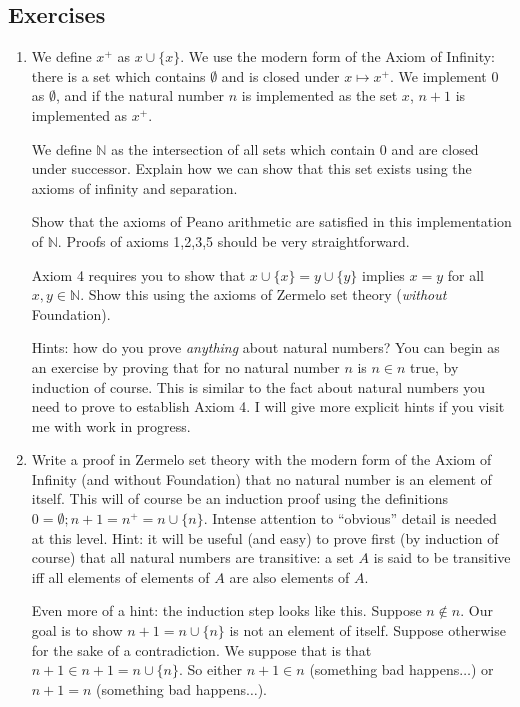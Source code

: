 \documentclass[12pt]{book}
\begin{document}
\newpage

\subsection{Exercises}

\begin{enumerate}

\item  We define $x^+$ as $x \cup \{x\}$.  We use the modern form of the
Axiom of Infinity:  there is a set which contains $\emptyset$ and is closed
under $x \mapsto x^+$.  We implement 0 as $\emptyset$, and if the natural
number $n$ is implemented as the set $x$, $n+1$ is implemented as $x^+$.

We define $\mathbb N$ as the intersection of all sets which contain 0
and are closed under successor.  Explain how we can show that this set
exists using the axioms of infinity and separation.

Show that the axioms of Peano arithmetic are satisfied in this implementation
of $\mathbb N$.  Proofs of axioms 1,2,3,5 should be very straightforward.

Axiom 4 requires you to show that $x \cup \{x\} = y \cup \{y\}$ implies
$x=y$ for all $x,y \in {\mathbb N}$.  Show this using the axioms of Zermelo
set theory ({\em without\/} Foundation).

Hints: how do you prove {\em anything\/} about natural numbers?  You
can begin as an exercise by proving that for no natural number $n$ is
$n \in n$ true, by induction of course.  This is similar to the fact
about natural numbers you need to prove to establish Axiom 4.  I will
give more explicit hints if you visit me with work in progress.

\item 
Write a proof in Zermelo set theory with the modern form of the Axiom
of Infinity (and without Foundation) that no natural number is an
element of itself.  This will of course be an induction proof using
the definitions $0 = \emptyset; n+1 = n^+ = n\cup \{n\}$.  Intense
attention to ``obvious'' detail is needed at this level.  Hint: it
will be useful (and easy) to prove first (by induction of course) that
all natural numbers are transitive:  a set $A$ is said to be transitive iff all elements of elements of $A$ are also elements of $A$.

Even more of a hint: the induction step looks like this.  Suppose $n
\not\in n$.  Our goal is to show $n+1 = n \cup \{n\}$ is not an element of itself.  Suppose otherwise for the sake of a contradiction.  We suppose that
is that $n+1 \in n+1 = n \cup \{n\}$.  So either $n+1 \in n$ (something
bad happens$\ldots$) or $n+1 = n$ (something bad happens$\ldots$).

\end{enumerate}
\end{document}
